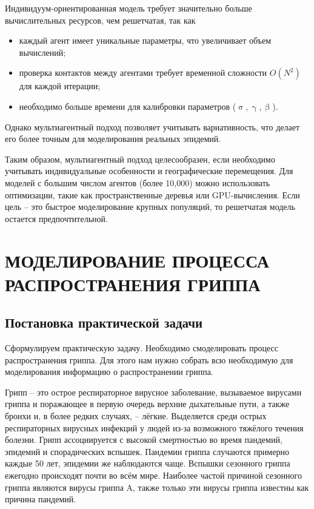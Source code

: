 \documentclass[a4paper, 14pt]{extreport}
\numberwithin{equation}{section}
\renewcommand{\beta}{\upbeta}
\renewcommand{\gamma}{\upgamma}
\renewcommand{\sigma}{\upsigma}
\begin{document}
	Индивидуум-ориентированная модель требует значительно больше вычислительных ресурсов, чем решетчатая, так как
	\begin{itemize}
		\item каждый агент имеет уникальные параметры, что увеличивает объем вычислений;
		\item проверка контактов между агентами требует временной сложности $O(N^2)$ для каждой итерации;
		\item необходимо больше времени для калибровки параметров ($\sigma, \gamma, \beta$).
	\end{itemize}
	
	Однако мультиагентный подход позволяет учитывать вариативность, что делает его более точным для моделирования реальных эпидемий.
	
	Таким образом, мультиагентный подход целесообразен, если необходимо учитывать индивидуальные особенности и географические перемещения. Для моделей с большим числом агентов (более 10,000) можно использовать оптимизации, такие как пространственные деревья или GPU-вычисления. Если цель -- это быстрое моделирование крупных популяций, то решетчатая модель остается предпочтительной.
	
	
	\newpage
	\chapter{МОДЕЛИРОВАНИЕ ПРОЦЕССА РАСПРОСТРАНЕНИЯ ГРИППА}
	\section{Постановка практической задачи}
	Сформулируем практическую задачу. Необходимо смоделировать процесс распространения гриппа. Для этого нам нужно собрать всю необходимую для моделирования информацию о распространении гриппа.
	
	Грипп -- это острое респираторное вирусное заболевание, вызываемое вирусами гриппа и поражающее в первую очередь верхние дыхательные пути, а также бронхи и, в более редких случаях, -- лёгкие. Выделяется среди острых респираторных вирусных инфекций у людей из-за возможного тяжёлого течения болезни. Грипп ассоциируется с высокой смертностью во время пандемий, эпидемий и спорадических вспышек. Пандемии гриппа случаются примерно каждые 50 лет, эпидемии же наблюдаются чаще. Вспышки сезонного гриппа ежегодно происходят почти во всём мире. Наиболее частой причиной сезонного гриппа являются вирусы гриппа A, также только эти вирусы гриппа известны как причина пандемий.
	
\end{document}
